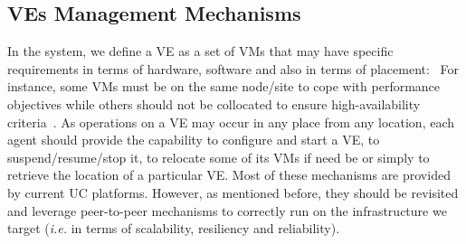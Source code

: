 




\subsection{VEs Management Mechanisms}
\label{ssec:vem}
In the \discovery system, we define a VE as a set of VMs that may have specific
requirements in terms of hardware, software and also in terms of placement:~
For instance, some VMs must be on the same node/site to cope with performance objectives while
others should not be collocated to ensure
high-availability criteria~\cite{hermenier:2013}.
As operations on a VE may occur in any place from any location, each agent should provide the capability
to configure and start a VE, to suspend/resume/stop it, to relocate some of its VMs if need be or simply to retrieve the location of a particular VE. 
Most of these mechanisms are provided by current UC platforms. However, as mentioned before, they
should be revisited and leverage peer-to-peer mechanisms to correctly run on the infrastructure we target
(\textit{i.e.} in terms of scalability, resiliency and reliability).

